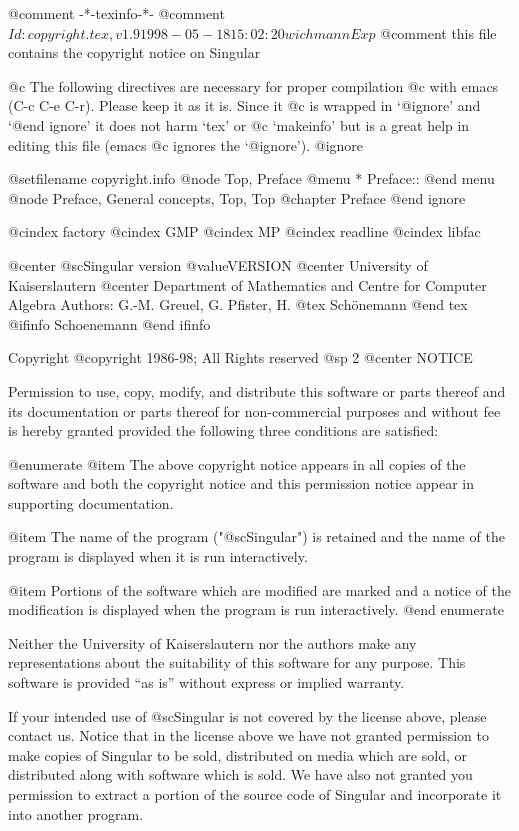 @comment -*-texinfo-*-
@comment $Id: copyright.tex,v 1.9 1998-05-18 15:02:20 wichmann Exp $
@comment this file contains the copyright notice on Singular

@c The following directives are necessary for proper compilation
@c with emacs (C-c C-e C-r).  Please keep it as it is.  Since it
@c is wrapped in `@ignore' and `@end ignore' it does not harm `tex' or
@c `makeinfo' but is a great help in editing this file (emacs
@c ignores the `@ignore').
@ignore

@setfilename copyright.info
@node Top, Preface
@menu
* Preface::
@end menu
@node Preface, General concepts, Top, Top
@chapter Preface
@end ignore

@cindex factory
@cindex GMP
@cindex MP
@cindex readline
@cindex libfac

@center @sc{Singular} version @value{VERSION}
@center University of Kaiserslautern
@center Department of Mathematics and Centre for Computer Algebra
Authors: G.-M. Greuel, G. Pfister, H.
@tex
Sch\"onemann
@end tex
@ifinfo
Schoenemann
@end ifinfo

Copyright @copyright{} 1986-98; All Rights reserved
@sp 2
                                @center NOTICE

Permission to use, copy, modify, and distribute this software or parts
thereof and its documentation or parts thereof for non-commercial
purposes and without fee is hereby granted provided the following three
conditions are satisfied:

@enumerate
@item
The above copyright notice appears in all copies of the software
and both the copyright notice and this permission notice
appear in supporting documentation.

@item
The name of the program ("@sc{Singular}") is retained and the name of
the program is displayed when it is run interactively.

@item
Portions of the software which are modified are marked and a notice of the
modification is displayed when the program is run interactively.
@end enumerate

Neither the University of Kaiserslautern nor the authors make any
representations about the suitability of this software for any
purpose.  This software is provided ``as is'' without express or
implied warranty.

If your intended use of @sc{Singular} is not covered by the license above,
please contact us.  Notice that in the license above we have not
granted permission to make copies of Singular to be sold, distributed
on media which are sold, or distributed along with software which is
sold. We have also not granted you permission to extract a portion
of the source code of Singular and incorporate it into another program.

